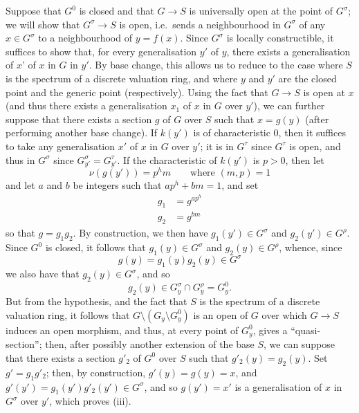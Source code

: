 \documentclass{article}
\newcommand{\oldpage}[1]{\marginpar{\footnotesize$\Big\vert$ \textit{p.~#1}}}
\theoremstyle{definition}
\theoremstyle{definition}
\theoremstyle{definition}
\theoremstyle{definition}
\theoremstyle{remark}
\begin{document}
Suppose that \(G^0\) is closed and that \(G\to S\) is universally open at the point of \(G^\sigma\);
we will show that \(G^\sigma\to S\) is open, i.e.~sends a neighbourhood in \(G^\sigma\) of any \(x\in G^\sigma\) to a neighbourhood of \(y=f(x)\).
Since \(G^\sigma\) is locally constructible, it suffices to show that, for every generalisation \(y'\) of \(y\), there exists a generalisation of \(x\)' of \(x\) in \(G\) in \(y'\).
By base change, this allows us to reduce to the case where \(S\) is the spectrum of a discrete valuation ring, and where \(y\) and \(y'\) are the closed point and the generic point (respectively).
Using the fact that \(G\to S\) is open at \(x\) (and thus there exists a generalisation \(x_1\) of \(x\) in \(G\) over \(y'\)), we can further suppose that there exists a section \(g\) of \(G\) over \(S\) such that \(x=g(y)\) (after performing another base change).
If \(k(y')\) is of characteristic \(0\), then it suffices to take any generalisation \(x'\) of \(x\) in \(G\) over \(y'\);
it is in \(G^\tau\) since \(G^\tau\) is open, and thus in \(G^\sigma\) since \(G_{y'}^\sigma=G_{y'}^\tau\).
If the characteristic of \(k(y')\) is \(p>0\), then let
\[
  \nu(g(y'))
  = p^hm
  \qquad\text{where }(m,p)=1
\]
\oldpage{236-07}and let \(a\) and \(b\) be integers such that \(ap^h+bm=1\), and set
\[
  \begin{aligned}
    g_1
    &= g^{ap^h}
  \\g_2
    &= g^{bm}
  \end{aligned}
\]
so that \(g=g_1g_2\).
By construction, we then have \(g_1(y')\in G^\sigma\) and \(g_2(y')\in G^\rho\).
Since \(G^0\) is closed, it follows that \(g_1(y)\in G^\sigma\) and \(g_2(y)\in G^\rho\), whence, since
\[
  g(y)
  = g_1(y)g_2(y) \in G^\sigma
\]
we also have that \(g_2(y)\in G^\sigma\), and so
\[
  g_2(y)\in G_y^\sigma\cap G_y^\rho
  = G_y^0.
\]
But from the hypothesis, and the fact that \(S\) is the spectrum of a discrete valuation ring, it follows that \(G\setminus(G_y\setminus G_y^0)\) is an open of \(G\) over which \(G\to S\) induces an open morphism, and thus, at every point of \(G_y^0\), gives a ``quasi-section'';
then, after possibly another extension of the base \(S\), we can suppose that there exists a section \(g'_2\) of \(G^0\) over \(S\) such that \(g'_2(y)=g_2(y)\).
Set \(g'=g_1g'_2\);
then, by construction, \(g'(y)=g(y)=x\), and \(g'(y')=g_1(y')g'_2(y')\in G^\sigma\), and so \(g(y')=x'\) is a generalisation of \(x\) in \(G^\sigma\) over \(y'\), which proves (iii).
\end{document}
